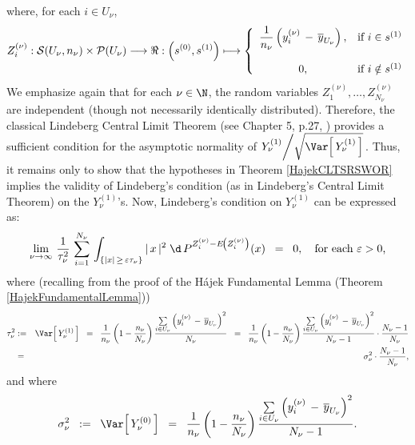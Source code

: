 where, for each $i \in U_{\nu}$,
\begin{equation*}
Z^{(\nu)}_{i} : \mathcal{S}(U_{\nu},n_{\nu}) \times \mathcal{P}(U_{\nu}) \longrightarrow \Re :
\left(s^{(0)},s^{(1)}\right) \longmapsto
\left\{\begin{array}{cl}
\dfrac{1}{n_{\nu}}\left(y^{(\nu)}_{i}\,-\,\overline{y}_{U_{\nu}}\right), & \textnormal{if $i \in s^{(1)}$}
\\ \\
0, & \textnormal{if $i \notin s^{(1)}$}
\end{array}\right.
\end{equation*}
We emphasize again that for each $\nu\in\N$, the random variables
$Z^{(\nu)}_{1}, \ldots, Z^{(\nu)}_{N_{\nu}}$ are independent
(though not necessarily identically distributed).
Therefore, the classical Lindeberg Central Limit Theorem
(see Chapter 5, p.27, \cite{Ferguson1996})
provides a sufficient condition for
the asymptotic normality of $Y^{(1)}_{\nu}\!\left/\sqrt{\Var\!\left[\,Y^{(1)}_{\nu}\,\right]}\right.$.
Thus, it remains only to show that the hypotheses in Theorem \ref{HajekCLTSRSWOR}
implies the validity of Lindeberg's condition (as in Lindeberg's Central Limit Theorem) on the $Y^{(1)}_{\nu}$'s.
Now, Lindeberg's condition on $Y^{(1)}_{\nu}$ can be expressed as:
\begin{equation*}
\lim_{\nu\rightarrow\infty}\,
\dfrac{1}{\tau^{2}_{\nu}}\,
\sum_{i=1}^{N_{\nu}}\,
\int_{\left\{\vert x\vert \,\geq\, \varepsilon\tau_{\nu}\right\}}
\vert\,x\,\vert^{2}\;
\d\,P^{Z^{(\nu)}_{i} - E\!\left(Z^{(\nu)}_{i}\right)}(x)
\;\;=\;\;0,
\quad\textnormal{for each $\varepsilon > 0$,}
\end{equation*}
where (recalling from the proof of the H\'ajek Fundamental Lemma (Theorem \ref{HajekFundamentalLemma}))
\begin{eqnarray*}
\tau^{2}_{\nu}
& := &
\Var\!\left[\,Y^{(1)}_{\nu}\,\right]
\;\; = \;\;
\dfrac{1}{n_{\nu}}
\left(1 - \dfrac{n_{\nu}}{N_{\nu}}\right)
\dfrac{\underset{i\in U_{\nu}}{\sum}\left(y^{(\nu)}_{i}\,-\,\overline{y}_{U_{\nu}}\right)^{2}}{N_{\nu}}
\;\; = \;\;
\dfrac{1}{n_{\nu}}
\left(1 - \dfrac{n_{\nu}}{N_{\nu}}\right)
\dfrac{\underset{i\in U_{\nu}}{\sum}\left(y^{(\nu)}_{i}\,-\,\overline{y}_{U_{\nu}}\right)^{2}}{N_{\nu}-1}
\cdot
\dfrac{N_{\nu}-1}{N_{\nu}}
\\
& = &
\sigma^{2}_{\nu}
\cdot
\dfrac{N_{\nu}-1}{N_{\nu}},
\end{eqnarray*}
and where
\begin{equation*}
\sigma^{2}_{\nu}
\;\; := \;\;
\Var\!\left[\,Y^{(0)}_{\nu}\,\right]
\;\; = \;\;
\dfrac{1}{n_{\nu}}
\left(1 - \dfrac{n_{\nu}}{N_{\nu}}\right)
\dfrac{\underset{i\in U_{\nu}}{\sum}\left(y^{(\nu)}_{i}\,-\,\overline{y}_{U_{\nu}}\right)^{2}}{N_{\nu}-1}.
\end{equation*}
